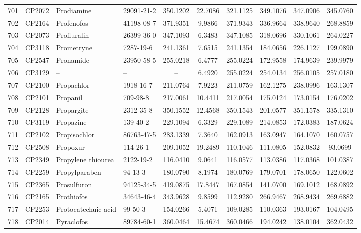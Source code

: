 \begin{longtable}{clllcccccc}
701 & CP2072 & Prodiamine & 29091-21-2 & 350.1202 & 22.7086 & 321.1125 & 349.1076 & 347.0906 & 345.0760 \\ 
702 & CP2164 & Profenofos & 41198-08-7 & 371.9351 & 9.9866 & 371.9343 & 336.9664 & 338.9640 & 268.8859 \\ 
703 & CP2073 & Profluralin & 26399-36-0 & 347.1093 & 6.3483 & 347.1085 & 318.0696 & 330.1061 & 264.0227 \\ 
704 & CP3118 & Prometryne & 7287-19-6 & 241.1361 & 7.6515 & 241.1354 & 184.0656 & 226.1127 & 199.0890 \\ 
705 & CP2547 & Pronamide & 23950-58-5 & 255.0218 & 6.4777 & 255.0224 & 172.9558 & 174.9639 & 239.9979 \\ 
706 & CP3129 & – & – & – & 6.4920 & 255.0224 & 254.0134 & 256.0105 & 257.0180 \\ 
707 & CP2100 & Propachlor & 1918-16-7 & 211.0764 & 7.9223 & 211.0759 & 162.1275 & 238.0996 & 163.1307 \\ 
708 & CP2101 & Propanil & 709-98-8 & 217.0061 & 10.4411 & 217.0054 & 175.0124 & 173.0154 & 176.0202 \\ 
709 & CP2128 & Propargite & 2312-35-8 & 350.1552 & 12.4568 & 350.1543 & 201.0577 & 351.1578 & 335.1310 \\ 
710 & CP3119 & Propazine & 139-40-2 & 229.1094 & 6.3329 & 229.1089 & 214.0853 & 172.0383 & 187.0624 \\ 
711 & CP2102 & Propisochlor & 86763-47-5 & 283.1339 & 7.3640 & 162.0913 & 163.0947 & 164.1070 & 160.0757 \\ 
712 & CP2508 & Propoxur & 114-26-1 & 209.1052 & 19.2489 & 110.1046 & 111.0805 & 152.0832 & 93.0699 \\ 
713 & CP2349 & Propylene thiourea & 2122-19-2 & 116.0410 & 9.0641 & 116.0577 & 113.0386 & 117.0368 & 101.0387 \\ 
714 & CP2259 & Propylparaben & 94-13-3 & 180.0790 & 8.1974 & 180.0769 & 179.0701 & 178.0650 & 122.0602 \\ 
715 & CP2365 & Prosulfuron\smash{\textsuperscript{\textdaggerdbl}} & 94125-34-5 & 419.0875 & 17.8447 & 167.0854 & 141.0700 & 169.1012 & 168.0892 \\ 
716 & CP2165 & Prothiofos & 34643-46-4 & 343.9628 & 9.8599 & 112.9280 & 266.9467 & 268.9434 & 269.6882 \\ 
717 & CP2253 & Protocatechuic acid\smash{\textsuperscript{\textdagger}} & 99-50-3 & 154.0266 & 5.4071 & 109.0285 & 110.0363 & 193.0167 & 104.0495 \\ 
718 & CP2014 & Pyraclofos & 89784-60-1 & 360.0464 & 15.4674 & 360.0466 & 194.0242 & 138.0104 & 362.0432 \\ 

\end{longtable}

